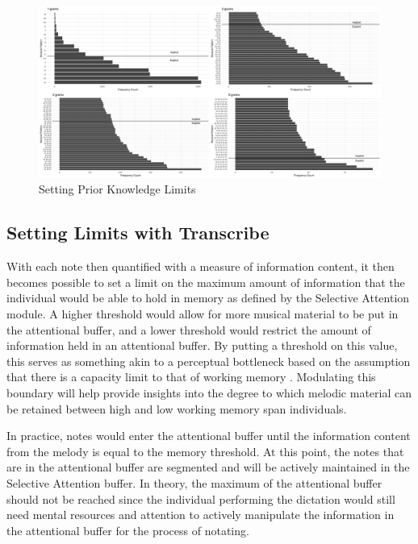 \documentclass[12pt,]{book}
\begin{document}
\begin{figure}

{\centering \includegraphics[width=1\linewidth]{img/pk_grampanel} 

}

\caption{Setting Prior Knowledge Limits}\label{fig:thresholds}
\end{figure}

\hypertarget{setting-limits-with-transcribe}{%
\subsection{Setting Limits with Transcribe}\label{setting-limits-with-transcribe}}

With each note then quantified with a measure of information content, it then becomes possible to set a limit on the maximum amount of information that the individual would be able to hold in memory as defined by the Selective Attention module.
A higher threshold would allow for more musical material to be put in the attentional buffer, and a lower threshold would restrict the amount of information held in an attentional buffer.
By putting a threshold on this value, this serves as something akin to a perceptual bottleneck based on the assumption that there is a capacity limit to that of working memory \citep{cowanEvolvingConceptionsMemory1988, cowanMagicalMysteryFour2010}.
Modulating this boundary will help provide insights into the degree to which melodic material can be retained between high and low working memory span individuals.

In practice, notes would enter the attentional buffer until the information content from the melody is equal to the memory threshold.
At this point, the notes that are in the attentional buffer are segmented and will be actively maintained in the Selective Attention buffer.
In theory, the maximum of the attentional buffer should not be reached since the individual performing the dictation would still need mental resources and attention to actively manipulate the information in the attentional buffer for the process of notating.
\end{document}
